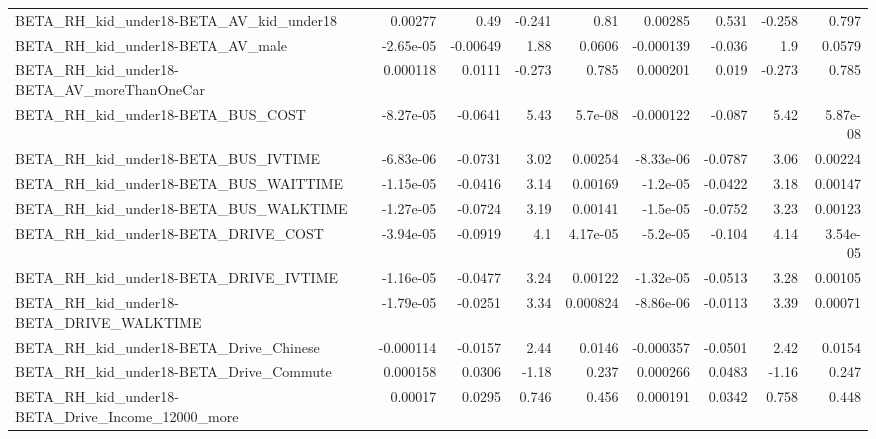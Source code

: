 \begin{tabular}{lrrrrrrrr}
BETA\_RH\_kid\_under18-BETA\_AV\_kid\_under18            &     0.00277 &         0.49 &   -0.241 &     0.81 &    0.00285 &       0.531 &       -0.258 &         0.797 \\
BETA\_RH\_kid\_under18-BETA\_AV\_male                   &   -2.65e-05 &     -0.00649 &     1.88 &   0.0606 &  -0.000139 &      -0.036 &          1.9 &        0.0579 \\
BETA\_RH\_kid\_under18-BETA\_AV\_moreThanOneCar         &    0.000118 &       0.0111 &   -0.273 &    0.785 &   0.000201 &       0.019 &       -0.273 &         0.785 \\
BETA\_RH\_kid\_under18-BETA\_BUS\_COST                  &   -8.27e-05 &      -0.0641 &     5.43 &  5.7e-08 &  -0.000122 &      -0.087 &         5.42 &      5.87e-08 \\
BETA\_RH\_kid\_under18-BETA\_BUS\_IVTIME                &   -6.83e-06 &      -0.0731 &     3.02 &  0.00254 &  -8.33e-06 &     -0.0787 &         3.06 &       0.00224 \\
BETA\_RH\_kid\_under18-BETA\_BUS\_WAITTIME              &   -1.15e-05 &      -0.0416 &     3.14 &  0.00169 &   -1.2e-05 &     -0.0422 &         3.18 &       0.00147 \\
BETA\_RH\_kid\_under18-BETA\_BUS\_WALKTIME              &   -1.27e-05 &      -0.0724 &     3.19 &  0.00141 &   -1.5e-05 &     -0.0752 &         3.23 &       0.00123 \\
BETA\_RH\_kid\_under18-BETA\_DRIVE\_COST                &   -3.94e-05 &      -0.0919 &      4.1 & 4.17e-05 &   -5.2e-05 &      -0.104 &         4.14 &      3.54e-05 \\
BETA\_RH\_kid\_under18-BETA\_DRIVE\_IVTIME              &   -1.16e-05 &      -0.0477 &     3.24 &  0.00122 &  -1.32e-05 &     -0.0513 &         3.28 &       0.00105 \\
BETA\_RH\_kid\_under18-BETA\_DRIVE\_WALKTIME            &   -1.79e-05 &      -0.0251 &     3.34 & 0.000824 &  -8.86e-06 &     -0.0113 &         3.39 &       0.00071 \\
BETA\_RH\_kid\_under18-BETA\_Drive\_Chinese             &   -0.000114 &      -0.0157 &     2.44 &   0.0146 &  -0.000357 &     -0.0501 &         2.42 &        0.0154 \\
BETA\_RH\_kid\_under18-BETA\_Drive\_Commute             &    0.000158 &       0.0306 &    -1.18 &    0.237 &   0.000266 &      0.0483 &        -1.16 &         0.247 \\
BETA\_RH\_kid\_under18-BETA\_Drive\_Income\_12000\_more   &     0.00017 &       0.0295 &    0.746 &    0.456 &   0.000191 &      0.0342 &        0.758 &         0.448 \\

\end{tabular}
